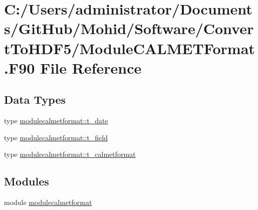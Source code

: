 \hypertarget{_module_c_a_l_m_e_t_format_8_f90}{}\section{C\+:/\+Users/administrator/\+Documents/\+Git\+Hub/\+Mohid/\+Software/\+Convert\+To\+H\+D\+F5/\+Module\+C\+A\+L\+M\+E\+T\+Format.F90 File Reference}
\label{_module_c_a_l_m_e_t_format_8_f90}
\subsection*{Data Types}
\begin{DoxyCompactItemize}
\item 
type \mbox{\hyperlink{structmodulecalmetformat_1_1t__date}{modulecalmetformat\+::t\+\_\+date}}
\item 
type \mbox{\hyperlink{structmodulecalmetformat_1_1t__field}{modulecalmetformat\+::t\+\_\+field}}
\item 
type \mbox{\hyperlink{structmodulecalmetformat_1_1t__calmetformat}{modulecalmetformat\+::t\+\_\+calmetformat}}
\end{DoxyCompactItemize}
\subsection*{Modules}
\begin{DoxyCompactItemize}
\item 
module \mbox{\hyperlink{namespacemodulecalmetformat}{modulecalmetformat}}
\end{DoxyCompactItemize}
